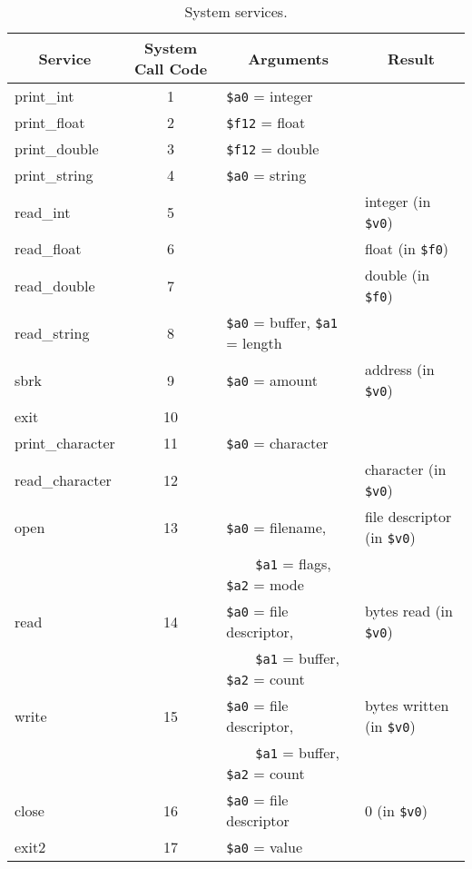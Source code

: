\documentclass[11pt]{article}
\begin{document}
\begin{table}
  \small
  \begin{center}
  \begin{tabular}{|l|c|l|l|}
    \hline
     \multicolumn{1}{|c|}{\bf Service} &
	{\bf System Call Code} &
	\multicolumn{1}{|c|}{\bf Arguments} &
	\multicolumn{1}{|c|}{\bf Result} \\
     \hline
     \hline
      print\_int & 1 & {\tt \$a0} = integer & \\
      print\_float & 2 & {\tt \$f12} = float & \\
      print\_double & 3 & {\tt \$f12} = double & \\
      print\_string & 4 & {\tt \$a0} = string & \\
      read\_int & 5 & & integer (in {\tt \$v0}) \\
      read\_float & 6 & & float (in {\tt \$f0}) \\
      read\_double & 7 & & double (in {\tt \$f0}) \\
      read\_string & 8 & {\tt \$a0} = buffer, {\tt \$a1} = length & \\
      sbrk & 9 & {\tt \$a0} = amount & address (in {\tt \$v0}) \\
      exit & 10 & & \\
      print\_character & 11 & {\tt \$a0} = character & \\
      read\_character & 12 & & character (in {\tt \$v0}) \\
      open & 13 &  {\tt \$a0} = filename, & file descriptor (in {\tt \$v0}) \\
           &    &  \ \ \ \ {\tt \$a1} = flags, {\tt \$a2} = mode & \\
      read & 14 & {\tt \$a0} = file descriptor, & bytes read (in {\tt \$v0}) \\
           &    &  \ \ \ \ {\tt \$a1} = buffer, {\tt \$a2} = count & \\
      write & 15 & {\tt \$a0} = file descriptor,& bytes written (in {\tt \$v0}) \\
            &    & \ \ \ \ {\tt \$a1} = buffer, {\tt \$a2} = count &                               \\
      close & 16 & {\tt \$a0} = file descriptor & 0 (in {\tt \$v0}) \\
      exit2 & 17 & {\tt \$a0} =  value &  \\
     \hline
  \end{tabular}
  \end{center}
  \caption{System services.}
  \label{tab:syscall}
\end{table}
\end{document}
